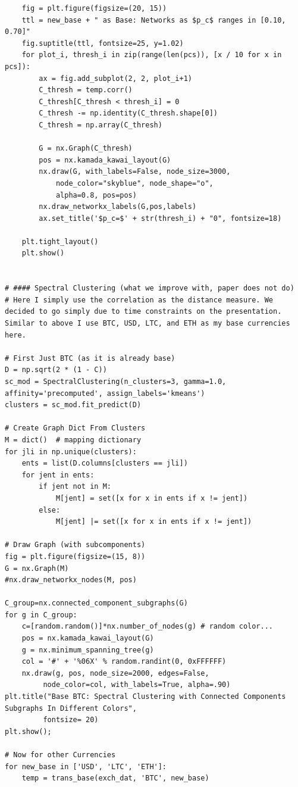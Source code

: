 \documentclass[a4paper]{article}
\begin{document}
\begin{lstlisting}
    fig = plt.figure(figsize=(20, 15))
    ttl = new_base + " as Base: Networks as $p_c$ ranges in [0.10, 0.70]"
    fig.suptitle(ttl, fontsize=25, y=1.02)
    for plot_i, thresh_i in zip(range(len(pcs)), [x / 10 for x in pcs]):
        ax = fig.add_subplot(2, 2, plot_i+1)
        C_thresh = temp.corr()
        C_thresh[C_thresh < thresh_i] = 0
        C_thresh -= np.identity(C_thresh.shape[0])
        C_thresh = np.array(C_thresh)

        G = nx.Graph(C_thresh)
        pos = nx.kamada_kawai_layout(G)
        nx.draw(G, with_labels=False, node_size=3000, 
            node_color="skyblue", node_shape="o", 
            alpha=0.8, pos=pos)
        nx.draw_networkx_labels(G,pos,labels)
        ax.set_title('$p_c=$' + str(thresh_i) + "0", fontsize=18)

    plt.tight_layout()
    plt.show()


# #### Spectral Clustering (what we improve with, paper does not do)
# Here I simply use the correlation as the distance measure. We decided to go simply due to time constraints on the presentation. Similar to above I use BTC, USD, LTC, and ETH as my base currencies here.

# First Just BTC (as it is already base)
D = np.sqrt(2 * (1 - C))
sc_mod = SpectralClustering(n_clusters=3, gamma=1.0, affinity='precomputed', assign_labels='kmeans')
clusters = sc_mod.fit_predict(D)

# Create Graph Dict From Clusters
M = dict()  # mapping dictionary
for jli in np.unique(clusters):
    ents = list(D.columns[clusters == jli])
    for jent in ents:
        if jent not in M:
            M[jent] = set([x for x in ents if x != jent])
        else:
            M[jent] |= set([x for x in ents if x != jent])

# Draw Graph (with subcomponents)
fig = plt.figure(figsize=(15, 8))
G = nx.Graph(M)
#nx.draw_networkx_nodes(M, pos)

C_group=nx.connected_component_subgraphs(G)
for g in C_group:
    c=[random.random()]*nx.number_of_nodes(g) # random color...
    pos = nx.kamada_kawai_layout(G)
    g = nx.minimum_spanning_tree(g)
    col = '#' + '%06X' % random.randint(0, 0xFFFFFF)
    nx.draw(g, pos, node_size=2000, edges=False,
         node_color=col, with_labels=True, alpha=.90)
plt.title("Base BTC: Spectral Clustering with Connected Components Subgraphs In Different Colors", 
         fontsize= 20)
plt.show();

# Now for other Currencies
for new_base in ['USD', 'LTC', 'ETH']:
    temp = trans_base(exch_dat, 'BTC', new_base)


\end{lstlisting}
\end{document}
